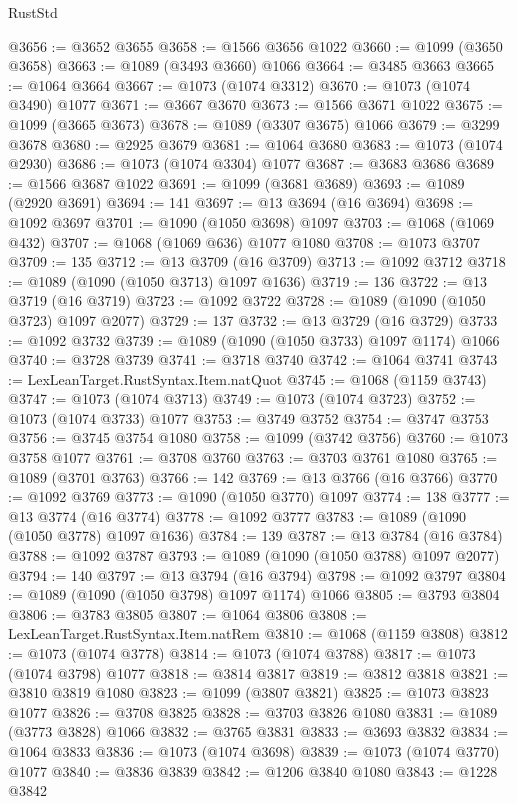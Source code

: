 \begin{lexlean}{RustStd}
\begin{coremodule}
@3656 := @3652 @3655
@3658 := @1566 @3656 @1022
@3660 := @1099 (@3650 @3658)
@3663 := @1089 (@3493 @3660) @1066
@3664 := @3485 @3663
@3665 := @1064 @3664
@3667 := @1073 (@1074 @3312)
@3670 := @1073 (@1074 @3490) @1077
@3671 := @3667 @3670
@3673 := @1566 @3671 @1022
@3675 := @1099 (@3665 @3673)
@3678 := @1089 (@3307 @3675) @1066
@3679 := @3299 @3678
@3680 := @2925 @3679
@3681 := @1064 @3680
@3683 := @1073 (@1074 @2930)
@3686 := @1073 (@1074 @3304) @1077
@3687 := @3683 @3686
@3689 := @1566 @3687 @1022
@3691 := @1099 (@3681 @3689)
@3693 := @1089 (@2920 @3691)
@3694 := 141
@3697 := @13 @3694 (@16 @3694)
@3698 := @1092 @3697
@3701 := @1090 (@1050 @3698) @1097
@3703 := @1068 (@1069 @432)
@3707 := @1068 (@1069 @636) @1077 @1080
@3708 := @1073 @3707
@3709 := 135
@3712 := @13 @3709 (@16 @3709)
@3713 := @1092 @3712
@3718 := @1089 (@1090 (@1050 @3713) @1097 @1636)
@3719 := 136
@3722 := @13 @3719 (@16 @3719)
@3723 := @1092 @3722
@3728 := @1089 (@1090 (@1050 @3723) @1097 @2077)
@3729 := 137
@3732 := @13 @3729 (@16 @3729)
@3733 := @1092 @3732
@3739 := @1089 (@1090 (@1050 @3733) @1097 @1174) @1066
@3740 := @3728 @3739
@3741 := @3718 @3740
@3742 := @1064 @3741
@3743 := LexLeanTarget.RustSyntax.Item.natQuot
@3745 := @1068 (@1159 @3743)
@3747 := @1073 (@1074 @3713)
@3749 := @1073 (@1074 @3723)
@3752 := @1073 (@1074 @3733) @1077
@3753 := @3749 @3752
@3754 := @3747 @3753
@3756 := @3745 @3754 @1080
@3758 := @1099 (@3742 @3756)
@3760 := @1073 @3758 @1077
@3761 := @3708 @3760
@3763 := @3703 @3761 @1080
@3765 := @1089 (@3701 @3763)
@3766 := 142
@3769 := @13 @3766 (@16 @3766)
@3770 := @1092 @3769
@3773 := @1090 (@1050 @3770) @1097
@3774 := 138
@3777 := @13 @3774 (@16 @3774)
@3778 := @1092 @3777
@3783 := @1089 (@1090 (@1050 @3778) @1097 @1636)
@3784 := 139
@3787 := @13 @3784 (@16 @3784)
@3788 := @1092 @3787
@3793 := @1089 (@1090 (@1050 @3788) @1097 @2077)
@3794 := 140
@3797 := @13 @3794 (@16 @3794)
@3798 := @1092 @3797
@3804 := @1089 (@1090 (@1050 @3798) @1097 @1174) @1066
@3805 := @3793 @3804
@3806 := @3783 @3805
@3807 := @1064 @3806
@3808 := LexLeanTarget.RustSyntax.Item.natRem
@3810 := @1068 (@1159 @3808)
@3812 := @1073 (@1074 @3778)
@3814 := @1073 (@1074 @3788)
@3817 := @1073 (@1074 @3798) @1077
@3818 := @3814 @3817
@3819 := @3812 @3818
@3821 := @3810 @3819 @1080
@3823 := @1099 (@3807 @3821)
@3825 := @1073 @3823 @1077
@3826 := @3708 @3825
@3828 := @3703 @3826 @1080
@3831 := @1089 (@3773 @3828) @1066
@3832 := @3765 @3831
@3833 := @3693 @3832
@3834 := @1064 @3833
@3836 := @1073 (@1074 @3698)
@3839 := @1073 (@1074 @3770) @1077
@3840 := @3836 @3839
@3842 := @1206 @3840 @1080
@3843 := @1228 @3842

\end{coremodule}
\end{lexlean}
